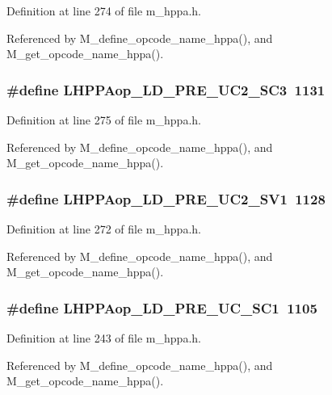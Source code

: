 Definition at line 274 of file m\_\-hppa.h.

Referenced by M\_\-define\_\-opcode\_\-name\_\-hppa(), and M\_\-get\_\-opcode\_\-name\_\-hppa().
\subsubsection{\setlength{\rightskip}{0pt plus 5cm}\#define LHPPAop\_\-LD\_\-PRE\_\-UC2\_\-SC3~1131}\label{m__hppa_8h_7b14994f7ec2ee6dfd23a5c960940378}




Definition at line 275 of file m\_\-hppa.h.

Referenced by M\_\-define\_\-opcode\_\-name\_\-hppa(), and M\_\-get\_\-opcode\_\-name\_\-hppa().
\subsubsection{\setlength{\rightskip}{0pt plus 5cm}\#define LHPPAop\_\-LD\_\-PRE\_\-UC2\_\-SV1~1128}\label{m__hppa_8h_a67a973c2cd6b42e17fc536b1269d101}




Definition at line 272 of file m\_\-hppa.h.

Referenced by M\_\-define\_\-opcode\_\-name\_\-hppa(), and M\_\-get\_\-opcode\_\-name\_\-hppa().
\subsubsection{\setlength{\rightskip}{0pt plus 5cm}\#define LHPPAop\_\-LD\_\-PRE\_\-UC\_\-SC1~1105}\label{m__hppa_8h_26cd5d3cb8b69b2cd2902d00030a7cae}




Definition at line 243 of file m\_\-hppa.h.

Referenced by M\_\-define\_\-opcode\_\-name\_\-hppa(), and M\_\-get\_\-opcode\_\-name\_\-hppa().

